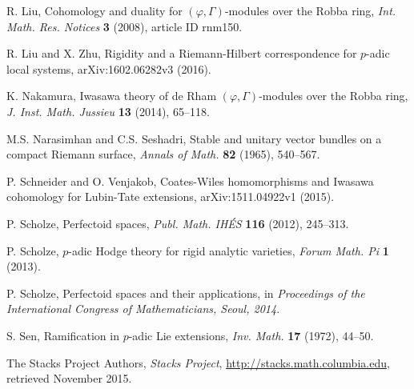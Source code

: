 \documentclass[12pt]{amsart}
\theoremstyle{definition}
\numberwithin{equation}{theorem}
\begin{document}
\begin{thebibliography}{99}
R. Liu, Cohomology and duality for $(\varphi, \Gamma)$-modules over the Robba ring,
\textit{Int. Math. Res. Notices} \textbf{3} (2008), article ID rnm150.

R. Liu and X. Zhu, Rigidity and a Riemann-Hilbert correspondence for $p$-adic local systems,
arXiv:1602.06282v3 (2016).

K. Nakamura, Iwasawa theory of de Rham $(\varphi, \Gamma)$-modules over the Robba ring,
\textit{J. Inst. Math. Jussieu} \textbf{13} (2014), 65--118. 

M.S. Narasimhan and C.S. Seshadri, Stable and unitary vector bundles on a compact Riemann surface, \textit{Annals of Math.} \textbf{82} (1965), 540--567.

P. Schneider and O. Venjakob, Coates-Wiles homomorphisms and Iwasawa cohomology for Lubin-Tate extensions, arXiv:1511.04922v1 (2015).

P. Scholze, Perfectoid spaces, \textit{Publ. Math. IH\'ES} \textbf{116} (2012), 245--313.

P. Scholze, $p$-adic Hodge theory for rigid analytic varieties, \textit{Forum Math. Pi} \textbf{1} (2013).

P. Scholze, Perfectoid spaces and their applications, in \textit{Proceedings of the
International Congress of Mathematicians, Seoul, 2014}.

S. Sen, Ramification in $p$-adic Lie extensions,
\textit{Inv. Math.} \textbf{17} (1972), 44--50.

The Stacks Project Authors, \textit{Stacks Project},
\url{http://stacks.math.columbia.edu}, retrieved November 2015.

\end{thebibliography}
\end{document}
